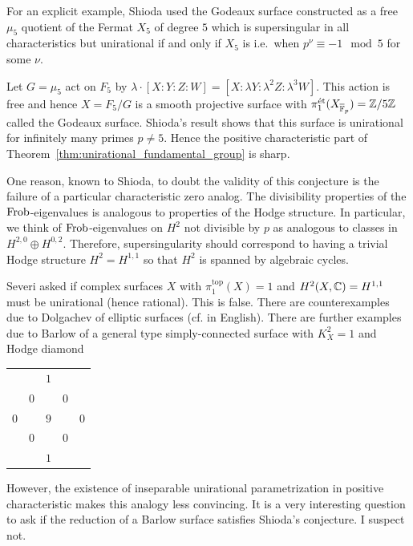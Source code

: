 \documentclass[main.tex]{subfiles}
\begin{document}
For an explicit example, Shioda used the Godeaux surface constructed as a free $\mu_5$ quotient of the Fermat $X_5$ of degree $5$ which is supersingular in all characteristics but unirational if and only if $X_5$ is i.e.\ when $p^\nu \equiv - 1 \mod 5$ for some $\nu$. 

\begin{example} \label{example:godeaux}
Let $G = \mu_5$ act on $F_5$ by $\lambda \cdot [X : Y : Z : W] = [X : \lambda Y : \lambda^2 Z : \lambda^3 W]$. This action is free and hence $X = F_5 / G$ is a smooth projective surface with $\pi_1^{\mathrm{\acute{e}t}}(X_{\overline{\mathbb{F}}_p}) = \mathbb{Z} / 5 \mathbb{Z}$ called the Godeaux surface. Shioda's result shows that this surface is unirational for infinitely many primes $p \neq 5$. Hence the positive characteristic part of Theorem~\ref{thm:unirational_fundamental_group} is sharp.
\end{example}


\begin{rmk} 
One reason, known to Shioda, to doubt the validity of this conjecture is the failure of a particular characteristic zero analog. The divisibility properties of the $\operatorname{\mathrm{Frob}}$-eigenvalues is analogous to properties of the Hodge structure. In particular, we think of $\operatorname{\mathrm{Frob}}$-eigenvalues on $H^2$ not divisible by $p$ as analogous to classes in $H^{2,0} \oplus H^{0,2}$. Therefore, supersingularity should correspond to having a trivial Hodge structure $H^2 = H^{1,1}$ so that $H^2$ is spanned by algebraic cycles.
\par 
Severi asked if complex surfaces $X$ with $\pi_1^{\mathrm{top}}(X) = 1$ and $H^2(X, \mathbb{C}) = H^{1,1}$ must be unirational (hence rational). This is false. There are counterexamples due to Dolgachev of elliptic surfaces \cite{dolgachev:surface_example_russian_1966} (cf. \cite{dolgachev:surface_example} in English). There are further examples due to Barlow \cite{barlow:surface_example} of a general type simply-connected surface with $K_X^2 = 1$ and Hodge diamond
\begin{center}
\begin{tabular}{ccccc}
 &  & $1$ &  &  \\
 & $0$ &  & $0$ &  \\
$0$ &  & $9$ &  & $0$ \\
 & $0$ &  & $0$ &  \\
 &  & $1$ &  &  \\
\end{tabular}    
\end{center}
However, the existence of inseparable unirational parametrization in positive characteristic makes this analogy less convincing. It is a very interesting question to ask if the reduction of a Barlow surface satisfies Shioda's conjecture. I suspect not. 
\end{rmk}
\end{document}
